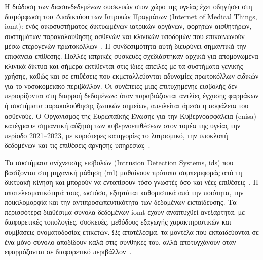 



Η διάδοση των διασυνδεδεμένων συσκευών στον χώρο της υγείας έχει οδηγήσει στη διαμόρφωση του Διαδικτύου των Ιατρικών Πραγμάτων (Internet of Medical Things, \gls{iomt}): ενός οικοσυστήματος δικτυωμένων ιατρικών οργάνων, φορητών αισθητήρων, συστημάτων παρακολούθησης ασθενών και κλινικών υποδομών που επικοινωνούν μέσω ετερογενών πρωτοκόλλων~\cite{domenech2024ensuring}. Η συνδεσιμότητα αυτή διευρύνει σημαντικά την επιφάνεια επίθεσης. Πολλές ιατρικές συσκευές σχεδιάστηκαν αρχικά για απομονωμένα κλινικά δίκτυα και σήμερα εκτίθενται στις ίδιες απειλές με τα συστήματα γενικής χρήσης, καθώς και σε επιθέσεις που εκμεταλλεύονται αδυναμίες πρωτοκόλλων ειδικών για το νοσοκομειακό περιβάλλον. Οι συνέπειες μιας επιτυχημένης εισβολής δεν περιορίζονται στη διαρροή δεδομένων: όταν παραβιάζονται αντλίες έγχυσης φαρμάκων ή συστήματα παρακολούθησης ζωτικών σημείων, απειλείται άμεσα η ασφάλεια του ασθενούς. Ο Οργανισμός της Ευρωπαϊκής Ένωσης για την Κυβερνοασφάλεια (\gls{enisa}) κατέγραψε σημαντική αύξηση των κυβερνοεπιθέσεων στον τομέα της υγείας την περίοδο 2021--2023, με κυριότερες κατηγορίες το λυτρισμικό, την υποκλοπή δεδομένων και τις επιθέσεις άρνησης υπηρεσίας~\cite{enisa2023health}.

Τα συστήματα ανίχνευσης εισβολών (Intrusion Detection Systems, \gls{ids}) που βασίζονται στη μηχανική μάθηση (\gls{ml}) μαθαίνουν πρότυπα συμπεριφοράς από τη δικτυακή κίνηση και μπορούν να εντοπίσουν τόσο γνωστές όσο και νέες επιθέσεις~\cite{chio2018machine}. Η αποτελεσματικότητά τους, ωστόσο, εξαρτάται καθοριστικά από την ποιότητα, την ποικιλομορφία και την αντιπροσωπευτικότητα των δεδομένων εκπαίδευσης. Τα περισσότερα διαθέσιμα σύνολα δεδομένων \gls{iomt} έχουν αναπτυχθεί ανεξάρτητα, με διαφορετικές τοπολογίες, συσκευές, μεθόδους εξαγωγής χαρακτηριστικών και συμβάσεις ονοματοδοσίας ετικετών. Ως αποτέλεσμα, τα μοντέλα που εκπαιδεύονται σε ένα μόνο σύνολο αποδίδουν καλά στις συνθήκες του, αλλά αποτυγχάνουν όταν εφαρμόζονται σε διαφορετικό περιβάλλον~\cite{domenech2025evaluating}.



